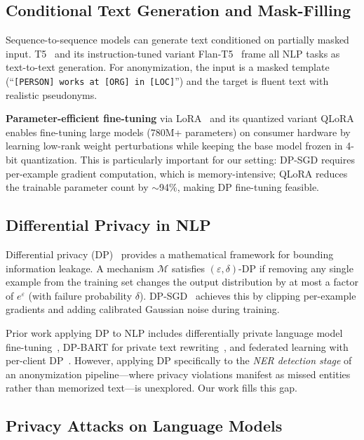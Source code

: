 \documentclass[11pt, a4paper]{article}
\begin{document}
\subsection{Conditional Text Generation and Mask-Filling}

Sequence-to-sequence models can generate text conditioned on partially
masked input.  T5~\cite{raffel2020t5} and its instruction-tuned
variant Flan-T5~\cite{chung2022flan_t5} frame all NLP tasks as
text-to-text generation.  For anonymization, the input is a masked
template (``\texttt{[PERSON] works at [ORG] in [LOC]}'') and the
target is fluent text with realistic pseudonyms.

\textbf{Parameter-efficient fine-tuning} via LoRA~\cite{hu2022lora}
and its quantized variant QLoRA~\cite{dettmers2023qlora} enables
fine-tuning large models (780M+ parameters) on consumer hardware by
learning low-rank weight perturbations while keeping the base model
frozen in 4-bit quantization.  This is particularly important for our
setting: DP-SGD requires per-example gradient computation, which is
memory-intensive; QLoRA reduces the trainable parameter count by
$\sim$94\%, making DP fine-tuning feasible.

\subsection{Differential Privacy in NLP}

Differential privacy (DP)~\cite{dwork2014algorithmic} provides a
mathematical framework for bounding information leakage.  A mechanism
$\mathcal{M}$ satisfies $(\varepsilon, \delta)$-DP if removing any
single example from the training set changes the output distribution
by at most a factor of $e^{\varepsilon}$ (with failure probability
$\delta$).  DP-SGD~\cite{abadi2016deep} achieves this by clipping
per-example gradients and adding calibrated Gaussian noise during
training.

Prior work applying DP to NLP includes differentially private language
model fine-tuning~\cite{yu2022differentially}, DP-BART for private
text rewriting~\cite{igamberdiev2023dp_bart}, and federated learning
with per-client DP~\cite{mcmahan2017federated}.  However, applying DP
specifically to the \emph{NER detection stage} of an anonymization
pipeline---where privacy violations manifest as missed entities rather
than memorized text---is unexplored.  Our work fills this gap.

\subsection{Privacy Attacks on Language Models}
\end{document}
